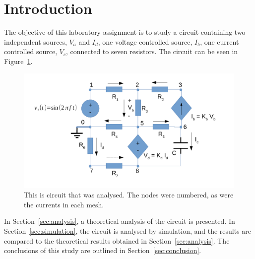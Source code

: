 \section{Introduction}
\label{sec:introduction}

The objective of this laboratory assignment is to study a circuit containing two independent sources, $V_a$ and $I_d$, one voltage controlled source, $I_b$, one current controlled source, $V_c$, connected to seven resistors. The circuit can be seen in Figure~\ref{fig1}.

\begin{figure}[h] \centering
\includegraphics[width=0.4\linewidth]{t2-t-3.pdf}
\caption{This is circuit that was analysed. The nodes were numbered, as were the currents in each mesh.}
\label{fig1}
\end{figure}

In Section~\ref{sec:analysis}, a theoretical analysis of the circuit is
presented. In Section~\ref{sec:simulation}, the circuit is analysed by
simulation, and the results are compared to the theoretical results obtained in
Section~\ref{sec:analysis}. The conclusions of this study are outlined in
Section~\ref{sec:conclusion}.

